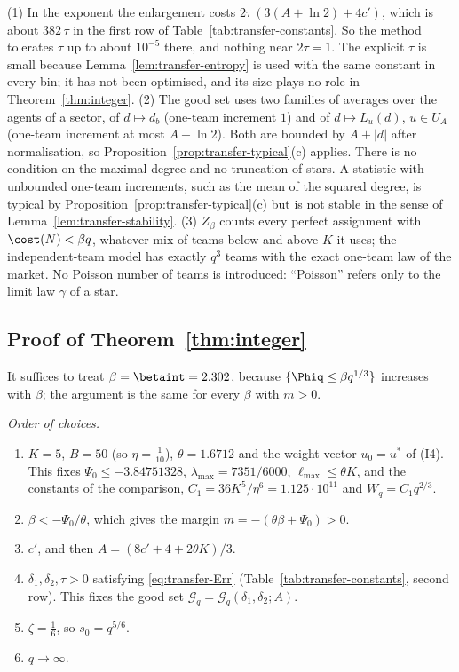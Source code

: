 \begin{remark}\label{rem:transfer-good}
(1) In the exponent the enlargement costs $2\tau\,(3(A+\ln2)+4c')$, which is about
$382\,\tau$ in the first row of Table~\ref{tab:transfer-constants}. So the method tolerates $\tau$ up to about
$10^{-5}$ there, and nothing near $2\tau=1$. The explicit $\tau$ is small because
Lemma~\ref{lem:transfer-entropy} is used with the same constant in every bin; it has not been
optimised, and its size plays no role in Theorem~\ref{thm:integer}.
(2) The good set uses two families of averages over the agents of a sector, of
$d\mapsto d_b$ (one-team increment $1$) and of $d\mapsto L_u(d)$, $u\in U_A$ (one-team
increment at most $A+\ln2$). Both are bounded by $A+|d|$ after normalisation, so
Proposition~\ref{prop:transfer-typical}(c) applies. There is no condition on the maximal
degree and no truncation of stars. A statistic with unbounded one-team increments, such as the
mean of the squared degree, is typical by Proposition~\ref{prop:transfer-typical}(c) but is not
stable in the sense of Lemma~\ref{lem:transfer-stability}.
(3) $Z_\beta$ counts every perfect assignment with $\cost(N)<\beta q$, whatever mix of teams
below and above $K$ it uses; the independent-team model has exactly $q^3$ teams with the exact
one-team law of the market. No Poisson number of teams is introduced: ``Poisson'' refers only
to the limit law $\gamma$ of a star.
\end{remark}

\subsection{Proof of Theorem~\ref{thm:integer}}\label{sec:transfer-assembly}

It suffices to treat $\beta=\betaint=2.302$, because $\{\Phiq\le\beta q^{1/3}\}$ increases with
$\beta$; the argument is the same for every $\beta$ with $m>0$.

\emph{Order of choices.}
\begin{enumerate}
\item $K=5$, $B=50$ (so $\eta=\tfrac1{10}$), $\theta=1.6712$ and the weight vector
$u_0=u^\ast$ of (I4). This fixes $\Psi_0\le-3.84751328$, $\lambda_{\max}=7351/6000$,
$\ell_{\max}\le\theta K$, and the constants of the comparison,
$C_1=36K^5/\eta^6=1.125\cdot10^{11}$ and $W_q=C_1q^{2/3}$.
\item $\beta<-\Psi_0/\theta$, which gives the margin $m=-(\theta\beta+\Psi_0)>0$.
\item $c'$, and then $A=(8c'+4+2\theta K)/3$.
\item $\delta_1,\delta_2,\tau>0$ satisfying \eqref{eq:transfer-Err}
(Table~\ref{tab:transfer-constants}, second row). This fixes the good set
$\mathcal G_q=\mathcal G_q(\delta_1,\delta_2;A)$.
\item $\zeta=\tfrac16$, so $s_0=q^{5/6}$.
\item $q\to\infty$.
\end{enumerate}


